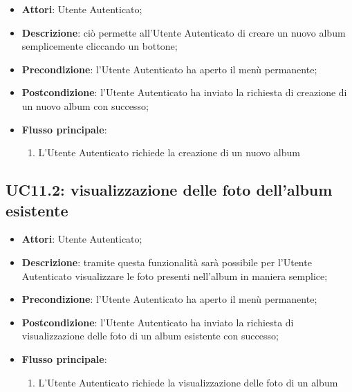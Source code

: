 \begin{itemize}
  \item \textbf{Attori}: Utente Autenticato;
  \item \textbf{Descrizione}: ciò permette all'Utente Autenticato di creare un
nuovo album semplicemente cliccando un bottone;
  \item \textbf{Precondizione}: l'Utente Autenticato ha aperto il menù
permanente;
  \item \textbf{Postcondizione}: l'Utente Autenticato ha inviato la richiesta
di creazione di un nuovo album con successo;
  \item \textbf{Flusso principale}:
  \begin{enumerate}
    \item L'Utente Autenticato richiede la creazione di un nuovo album
  \end{enumerate}
\end{itemize}



\subsection{UC11.2: visualizzazione delle foto dell'album esistente}
\label{uc:uc11.2}
\hypertarget{UC11.2}{}

\begin{itemize}
  \item \textbf{Attori}: Utente Autenticato;
  \item \textbf{Descrizione}: tramite questa funzionalità sarà possibile per
l'Utente Autenticato visualizzare le foto presenti nell'album in maniera
semplice;
  \item \textbf{Precondizione}: l'Utente Autenticato ha aperto il menù
permanente;
  \item \textbf{Postcondizione}: l'Utente Autenticato ha inviato la richiesta
di visualizzazione delle foto di un album esistente con successo;
  \item \textbf{Flusso principale}:
  \begin{enumerate}
    \item L'Utente Autenticato richiede la visualizzazione delle foto di un
album
  \end{enumerate}
\end{itemize}
